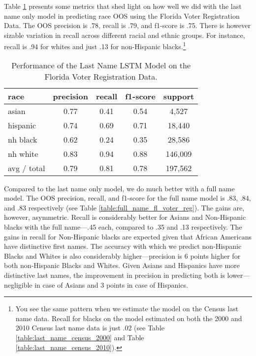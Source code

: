 \documentclass[12pt, letterpaper]{article}
\begin{document}
Table \ref{table:last_name_fl_voter_reg} presents some metrics that shed light on how well we did with the last name only model in predicting race OOS using the Florida Voter Registration Data. The OOS precision is .78, recall is .79, and f1-score is .75. There is however sizable variation in recall across different racial and ethnic groups. For instance, recall is .94 for whites and just .13 for non-Hispanic blacks.\footnote{You see the same pattern when we estimate the model on the Census last name data. Recall for blacks on the model estimated on both the 2000 and 2010 Census last name data is just .02 (see Table \ref{table:last_name_census_2000} and Table \ref{table:last_name_census_2010}).}

\begin{table}[h!]
\centering
\caption{Performance of the Last Name LSTM Model on the Florida Voter Registration Data.}
\begin{tabular}{ l c c c c }
\hline    
    race & precision & recall & f1-score & support \\
\hline
      asian &        0.77 &       0.41 &       0.54 &       4,527\\
   hispanic &        0.74 &       0.69 &       0.71 &      18,440\\
   nh black &        0.62 &       0.24 &       0.35 &      28,586\\
   nh white &        0.83 &       0.94 &       0.88 &     146,009\\

avg / total &        0.79 &       0.81 &       0.78 &     197,562\\

\hline
\end{tabular}
\label{table:last_name_fl_voter_reg}
\end{table}

Compared to the last name only model, we do much better with a full name model. The OOS precision, recall, and f1-score for the full name model is .83, .84, and .83 respectively (see Table \ref{table:full_name_fl_voter_reg}). The gains are, however, asymmetric. Recall is considerably better for Asians and Non-Hispanic blacks with the full name---.45 each, compared to .35 and .13 respectively. The gains in recall for Non-Hispanic blacks are expected given that African Americans have distinctive first names. The accuracy with which we predict non-Hispanic Blacks and Whites is also considerably higher---precision is 6 points higher for both non-Hispanic Blacks and Whites. Given Asians and Hispanics have more distinctive last names, the improvement in precision in predicting both is lower---negligible in case of Asians and 3 points in case of Hispanics.
\end{document}
